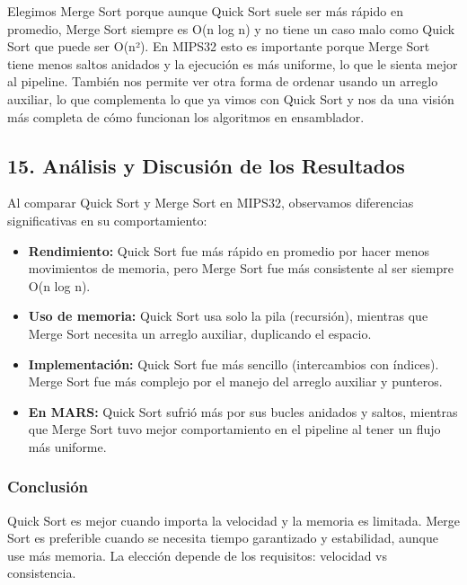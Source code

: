 \documentclass[12pt]{article}
\begin{document}
Elegimos Merge Sort porque aunque Quick Sort suele ser más rápido en promedio, Merge Sort siempre es O(n log n) y no tiene un caso malo como Quick Sort que puede ser O(n²). En MIPS32 esto es importante porque Merge Sort tiene menos saltos anidados y la ejecución es más uniforme, lo que le sienta mejor al pipeline. También nos permite ver otra forma de ordenar usando un arreglo auxiliar, lo que complementa lo que ya vimos con Quick Sort y nos da una visión más completa de cómo funcionan los algoritmos en ensamblador.

\subsection*{15. Análisis y Discusión de los Resultados}

Al comparar Quick Sort y Merge Sort en MIPS32, observamos diferencias significativas en su comportamiento:

\begin{itemize}
    \item \textbf{Rendimiento:} Quick Sort fue más rápido en promedio por hacer menos movimientos de memoria, pero Merge Sort fue más consistente al ser siempre O(n log n).
    \item \textbf{Uso de memoria:} Quick Sort usa solo la pila (recursión), mientras que Merge Sort necesita un arreglo auxiliar, duplicando el espacio.
    \item \textbf{Implementación:} Quick Sort fue más sencillo (intercambios con índices). Merge Sort fue más complejo por el manejo del arreglo auxiliar y punteros.
    \item \textbf{En MARS:} Quick Sort sufrió más por sus bucles anidados y saltos, mientras que Merge Sort tuvo mejor comportamiento en el pipeline al tener un flujo más uniforme.
\end{itemize}

\subsubsection*{Conclusión}

Quick Sort es mejor cuando importa la velocidad y la memoria es limitada. Merge Sort es preferible cuando se necesita tiempo garantizado y estabilidad, aunque use más memoria. La elección depende de los requisitos: velocidad vs consistencia.
\end{document}
